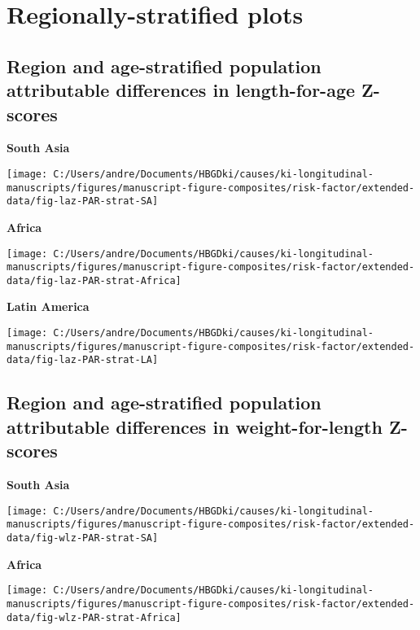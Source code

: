 \documentclass[
  9pt,
]{book}
\begin{document}
\hypertarget{RegionStrat}{%
\chapter{Regionally-stratified plots}\label{RegionStrat}}

\raggedright

\hypertarget{region-and-age-stratified-population-attributable-differences-in-length-for-age-z-scores}{%
\section{Region and age-stratified population attributable differences in length-for-age Z-scores}\label{region-and-age-stratified-population-attributable-differences-in-length-for-age-z-scores}}

\textbf{South Asia}

\texttt{[image: C:/Users/andre/Documents/HBGDki/causes/ki-longitudinal-manuscripts/figures/manuscript-figure-composites/risk-factor/extended-data/fig-laz-PAR-strat-SA]}

\textbf{Africa}

\texttt{[image: C:/Users/andre/Documents/HBGDki/causes/ki-longitudinal-manuscripts/figures/manuscript-figure-composites/risk-factor/extended-data/fig-laz-PAR-strat-Africa]}

\textbf{Latin America}

\texttt{[image: C:/Users/andre/Documents/HBGDki/causes/ki-longitudinal-manuscripts/figures/manuscript-figure-composites/risk-factor/extended-data/fig-laz-PAR-strat-LA]}

\hypertarget{region-and-age-stratified-population-attributable-differences-in-weight-for-length-z-scores}{%
\section{Region and age-stratified population attributable differences in weight-for-length Z-scores}\label{region-and-age-stratified-population-attributable-differences-in-weight-for-length-z-scores}}

\textbf{South Asia}

\texttt{[image: C:/Users/andre/Documents/HBGDki/causes/ki-longitudinal-manuscripts/figures/manuscript-figure-composites/risk-factor/extended-data/fig-wlz-PAR-strat-SA]}

\textbf{Africa}

\texttt{[image: C:/Users/andre/Documents/HBGDki/causes/ki-longitudinal-manuscripts/figures/manuscript-figure-composites/risk-factor/extended-data/fig-wlz-PAR-strat-Africa]}
\end{document}
